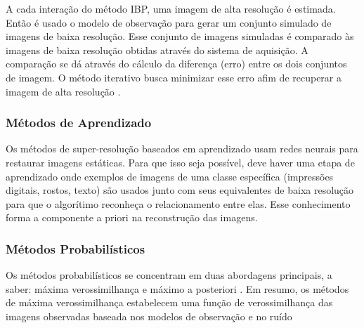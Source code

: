 
A cada interação do método IBP, uma imagem de alta resolução é estimada.
Então é usado o modelo de observação para gerar um conjunto simulado de imagens de baixa resolução.
Esse conjunto de imagens simuladas é comparado às imagens de baixa resolução obtidas através do sistema de aquisição.
A comparação se dá através do cálculo da diferença (erro) entre os dois conjuntos de imagem.
O método iterativo busca minimizar esse erro afim de recuperar a imagem de alta resolução \cite{park2003super,reis2014metodo}.


\subsubsection{Métodos de Aprendizado}
Os métodos de super-resolução baseados em aprendizado usam redes neurais para restaurar imagens estáticas.
Para que isso seja possível, deve haver uma etapa de aprendizado onde exemplos de imagens de uma classe específica (impressões digitais, rostos, texto) são usados junto com seus equivalentes de baixa resolução para que o algorítimo reconheça o relacionamento entre elas.
Esse conhecimento forma a componente a priori na reconstrução das imagens.

\subsubsection{Métodos Probabilísticos}
Os métodos probabilísticos se concentram em duas abordagens principais, a saber: máxima verossimilhança e máximo a posteriori \cite{nasrollahi2014super}.
Em resumo, os métodos de máxima verossimilhança estabelecem uma função de verossimilhança das imagens observadas baseada nos modelos de observação e no ruído

